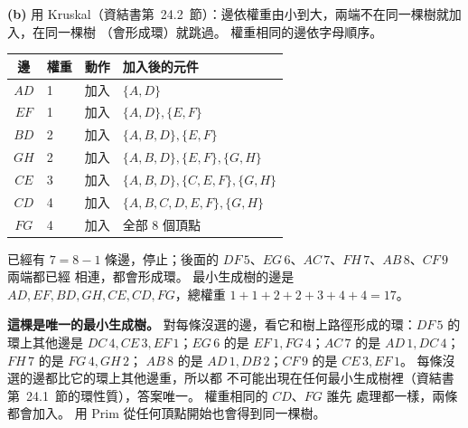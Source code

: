 \begin{pastsoln}
\textbf{(b)} 用 Kruskal（資結書第~24.2~節）：邊依權重由小到大，兩端不在同一棵樹就加入，在同一棵樹
（會形成環）就跳過。 權重相同的邊依字母順序。
\begin{center}
\begin{tabular}{clll}
\toprule
邊 & 權重 & 動作 & 加入後的元件 \\
\midrule
$AD$ & 1 & 加入 & $\{A, D\}$ \\
$EF$ & 1 & 加入 & $\{A, D\}, \{E, F\}$ \\
$BD$ & 2 & 加入 & $\{A, B, D\}, \{E, F\}$ \\
$GH$ & 2 & 加入 & $\{A, B, D\}, \{E, F\}, \{G, H\}$ \\
$CE$ & 3 & 加入 & $\{A, B, D\}, \{C, E, F\}, \{G, H\}$ \\
$CD$ & 4 & 加入 & $\{A, B, C, D, E, F\}, \{G, H\}$ \\
$FG$ & 4 & 加入 & 全部 8 個頂點 \\
\bottomrule
\end{tabular}
\end{center}
已經有 $7 = 8 - 1$ 條邊，停止；後面的 $DF\,5$、$EG\,6$、$AC\,7$、$FH\,7$、$AB\,8$、$CF\,9$ 兩端都已經
相連，都會形成環。 最小生成樹的邊是 $AD, EF, BD, GH, CE, CD, FG$，總權重 $1 + 1 + 2 + 2 + 3 + 4 + 4 = 17$。
\begin{center}
\end{center}

\textbf{這棵是唯一的最小生成樹。} 對每條沒選的邊，看它和樹上路徑形成的環：$DF\,5$ 的環上其他邊是
$DC\,4, CE\,3, EF\,1$；$EG\,6$ 的是 $EF\,1, FG\,4$；$AC\,7$ 的是 $AD\,1, DC\,4$；$FH\,7$ 的是 $FG\,4, GH\,2$；
$AB\,8$ 的是 $AD\,1, DB\,2$；$CF\,9$ 的是 $CE\,3, EF\,1$。 每條沒選的邊都比它的環上其他邊重，所以都
不可能出現在任何最小生成樹裡（資結書第~24.1~節的環性質），答案唯一。 權重相同的 $CD$、$FG$ 誰先
處理都一樣，兩條都會加入。 用 Prim 從任何頂點開始也會得到同一棵樹。
\end{pastsoln}
